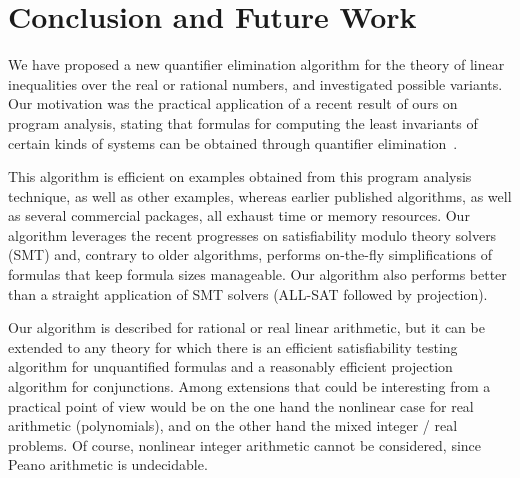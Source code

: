 \section{Conclusion and Future Work}
We have proposed a new quantifier elimination algorithm for the theory of linear inequalities over the real or rational numbers, and investigated possible variants. Our motivation was the practical application of a recent result of ours on program analysis, stating that formulas for computing the least invariants of certain kinds of systems can be obtained through quantifier elimination~\cite{Monniaux_SAS07}.

This algorithm is efficient on examples obtained from this program analysis technique, as well as other examples, whereas earlier published algorithms, as well as several commercial packages, all exhaust time or memory resources. Our algorithm leverages the recent progresses on satisfiability modulo theory solvers (SMT) and, contrary to older algorithms, performs on-the-fly simplifications of formulas that keep formula sizes manageable. Our algorithm also performs better than a straight application of SMT solvers (ALL-SAT followed by projection).

Our algorithm is described for rational or real linear arithmetic, but it can be extended to any theory for which there is an efficient satisfiability testing algorithm for unquantified formulas and a reasonably efficient projection algorithm for conjunctions. Among extensions that could be interesting from a practical point of view would be on the one hand the nonlinear case for real arithmetic (polynomials), and on the other hand the mixed integer / real problems. Of course, nonlinear integer arithmetic cannot be considered, since Peano arithmetic is undecidable.

